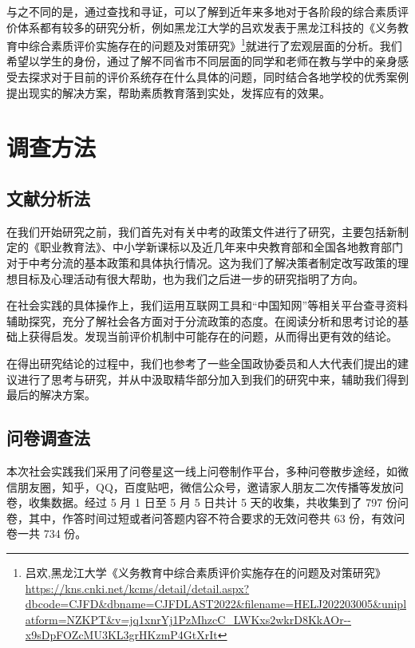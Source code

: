 \documentclass[12pt,UTF8]{ctexart}
\begin{document}
\par{与之不同的是，通过查找和寻证，可以了解到近年来多地对于各阶段的综合素质评价体系都有较多的研究分析，例如黑龙江大学的吕欢发表于黑龙江科技的《义务教育中综合素质评价实施存在的问题及对策研究》\footnote{吕欢,黑龙江大学《义务教育中综合素质评价实施存在的问题及对策研究》
		\url{https://kns.cnki.net/kcms/detail/detail.aspx?dbcode=CJFD&dbname=CJFDLAST2022&filename=HELJ202203005&uniplatform=NZKPT&v=jq1xnrYj1PzMhzcC_LWKxs2wkrD8KkAOr--x9sDpFOZcMU3KL3grHKzmP4GtXrIt}}就进行了宏观层面的分析。}我们希望以学生的身份，通过了解不同省市不同层面的同学和老师在教与学中的亲身感受去探求对于目前的评价系统存在什么具体的问题，同时结合各地学校的优秀案例提出现实的解决方案，帮助素质教育落到实处，发挥应有的效果。
\newpage

\section {调查方法}
\subsection {文献分析法}
\par{在我们开始研究之前，我们首先对有关中考的政策文件进行了研究，主要包括新制定的《职业教育法》、中小学新课标以及近几年来中央教育部和全国各地教育部门对于中考分流的基本政策和具体执行情况。这为我们了解决策者制定改写政策的理想目标及心理活动有很大帮助，也为我们之后进一步的研究指明了方向。}

\par{在社会实践的具体操作上，我们运用互联网工具和“中国知网”等相关平台查寻资料辅助探究，充分了解社会各方面对于分流政策的态度。在阅读分析和思考讨论的基础上获得启发。发现当前评价机制中可能存在的问题，从而得出更有效的结论。}

\par{在得出研究结论的过程中，我们也参考了一些全国政协委员和人大代表们提出的建议进行了思考与研究，并从中汲取精华部分加入到我们的研究中来，辅助我们得到最后的解决方案。}

\subsection {问卷调查法}
\par{本次社会实践我们采用了问卷星这一线上问卷制作平台，多种问卷散步途经，如微信朋友圈，知乎，QQ，百度贴吧，微信公众号，邀请家人朋友二次传播等发放问卷，收集数据。经过
	5 月 1 日至 5 月 5 日共计 5 天的收集，共收集到了 797 份问卷，其中，作答时间过短或者问答题内容不符合要求的无效问卷共 63 份，有效问卷一共
	734 份。}
\end{document}
